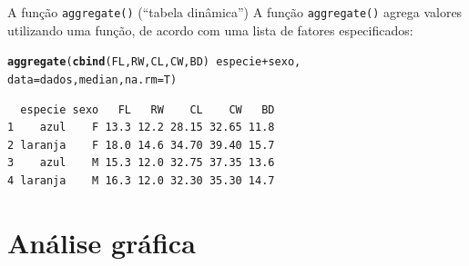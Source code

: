 \documentclass[10pt]{beamer}\usepackage[]{graphicx}\usepackage[]{color}
\makeatletter
\newcommand{\hlopt}[1]{\textcolor[rgb]{0,0,0}{#1}}%
\newcommand{\hlstd}[1]{\textcolor[rgb]{0.345,0.345,0.345}{#1}}%
\newcommand{\hlkwc}[1]{\textcolor[rgb]{0.333,0.667,0.333}{#1}}%
\newcommand{\hlkwd}[1]{\textcolor[rgb]{0.737,0.353,0.396}{\textbf{#1}}}%
\newenvironment{kframe}{%
 \def\at@end@of@kframe{}%
 \ifinner\ifhmode%
  \def\at@end@of@kframe{\end{minipage}}%
  \begin{minipage}{\columnwidth}%
 \fi\fi%
 \def\FrameCommand##1{\hskip\@totalleftmargin \hskip-\fboxsep
 \colorbox{shadecolor}{##1}\hskip-\fboxsep
     \hskip-\linewidth \hskip-\@totalleftmargin \hskip\columnwidth}%
 \MakeFramed {\advance\hsize-\width
   \@totalleftmargin\z@ \linewidth\hsize
   \@setminipage}}%
 {\par\unskip\endMakeFramed%
 \at@end@of@kframe}
\newenvironment{knitrout}{}{} %
\makeatother
\begin{document}

\begin{frame}[fragile]{A função \texttt{aggregate()} (``tabela dinâmica'')}
A função \texttt{aggregate()} agrega valores utilizando uma função, de
acordo com uma lista de fatores especificados:
\begin{knitrout}\small
{}\color{fgcolor}\begin{kframe}
\begin{alltt}
\hlkwd{aggregate}\hlstd{(}\hlkwd{cbind}\hlstd{(FL, RW, CL, CW, BD)} \hlopt{~} \hlstd{especie} \hlopt{+} \hlstd{sexo,}
          \hlkwc{data} \hlstd{= dados, median,} \hlkwc{na.rm}\hlstd{=T)}
\end{alltt}
\begin{verbatim}
  especie sexo   FL   RW    CL    CW   BD
1    azul    F 13.3 12.2 28.15 32.65 11.8
2 laranja    F 18.0 14.6 34.70 39.40 15.7
3    azul    M 15.3 12.0 32.75 37.35 13.6
4 laranja    M 16.3 12.0 32.30 35.30 14.7
\end{verbatim}
\end{kframe}
\end{knitrout}
\end{frame}

\section{Análise gráfica}
\end{document}

